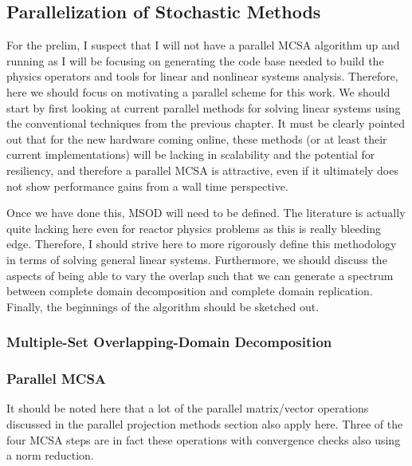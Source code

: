 \subsection{Parallelization of Stochastic Methods}
\label{subsec:parallel_stochastic_methods}
For the prelim, I suspect that I will not have a parallel MCSA
algorithm up and running as I will be focusing on generating the code
base needed to build the physics operators and tools for linear and
nonlinear systems analysis. Therefore, here we should focus on
motivating a parallel scheme for this work. We should start by first
looking at current parallel methods for solving linear systems using
the conventional techniques from the previous chapter. It must be
clearly pointed out that for the new hardware coming online, these
methods (or at least their current implementations) will be lacking in
scalability and the potential for resiliency, and therefore a parallel
MCSA is attractive, even if it ultimately does not show performance
gains from a wall time perspective.

Once we have done this, MSOD will need to be defined. The literature
is actually quite lacking here even for reactor physics problems as
this is really bleeding edge. Therefore, I should strive here to more
rigorously define this methodology in terms of solving general linear
systems. Furthermore, we should discuss the aspects of being able to
vary the overlap such that we can generate a spectrum between complete
domain decomposition and complete domain replication. Finally, the
beginnings of the algorithm should be sketched out.

\subsubsection{Multiple-Set Overlapping-Domain Decomposition}
\label{subsubsec:msod}

\subsubsection{Parallel MCSA}
\label{subsubsec:parallel_mcsa}
It should be noted here that a lot of the parallel matrix/vector
operations discussed in the parallel projection methods section also
apply here. Three of the four MCSA steps are in fact these operations
with convergence checks also using a norm reduction.

